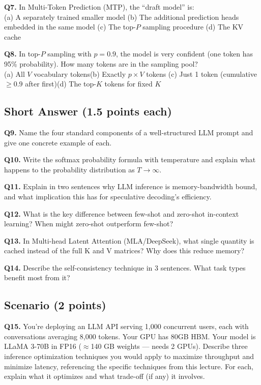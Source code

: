 \documentclass[11pt, a4paper]{article}
\begin{document}
\textbf{Q7.} In Multi-Token Prediction (MTP), the ``draft model'' is:\\
(a) A separately trained smaller model\quad
(b) The additional prediction heads embedded in the same model\quad
(c) The top-$P$ sampling procedure\quad
(d) The KV cache

\textbf{Q8.} In top-$P$ sampling with $p=0.9$, the model is very confident (one token has 95\% probability). How many tokens are in the sampling pool?\\
(a) All $V$ vocabulary tokens\quad (b) Exactly $p \times V$ tokens\quad
(c) Just 1 token (cumulative $\geq 0.9$ after first)\quad (d) The top-$K$ tokens for fixed $K$

\subsection*{Short Answer (1.5 points each)}

\textbf{Q9.} Name the four standard components of a well-structured LLM prompt and give one concrete example of each.

\textbf{Q10.} Write the softmax probability formula with temperature and explain what happens to the probability distribution as $T \to \infty$.

\textbf{Q11.} Explain in two sentences why LLM inference is memory-bandwidth bound, and what implication this has for speculative decoding's efficiency.

\textbf{Q12.} What is the key difference between few-shot and zero-shot in-context learning? When might zero-shot outperform few-shot?

\textbf{Q13.} In Multi-head Latent Attention (MLA/DeepSeek), what single quantity is cached instead of the full K and V matrices? Why does this reduce memory?

\textbf{Q14.} Describe the self-consistency technique in 3 sentences. What task types benefit most from it?

\subsection*{Scenario (2 points)}

\textbf{Q15.} You're deploying an LLM API serving 1,000 concurrent users, each with conversations averaging 8,000 tokens. Your GPU has 80GB HBM. Your model is LLaMA 3-70B in FP16 ($\approx$140 GB weights --- needs 2 GPUs). Describe three inference optimization techniques you would apply to maximize throughput and minimize latency, referencing the specific techniques from this lecture. For each, explain what it optimizes and what trade-off (if any) it involves.
\end{document}
